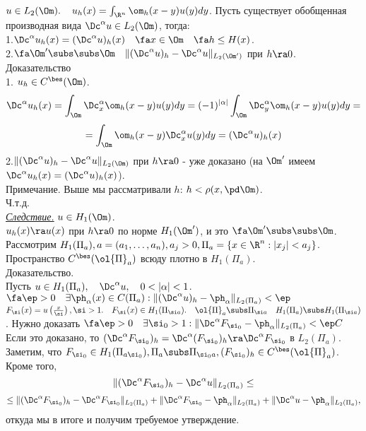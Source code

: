 \documentclass[a4paper,draft]{article}
\begin{document}
$u\in
L_2(\Om).\quad$$u_h(x)=\int_{\R^{n}}\om_h(x-y)u(y)dy$.
Пусть существует обобщенная производная вида
$\Dc^{\alpha}u\in L_2(\Om)$, тогда:\\
1.$\Dc^{\alpha}u_h(x)=(\Dc^{\alpha}u)_h(x) \quad
\fa x\in\Om \quad\fa h\le H(x)$.\\
2.$\fa \Om'\subs\subs\Om\quad
\|(\Dc^{\alpha}u)_h-\Dc^{\alpha}u\|_{L_2(\Om')}$
при $h\ra 0$.\\
Доказательство\\
1. $u_h\in C^{\bes}(\Om)$.
$$
\Dc^{\alpha}u_h(x)=\int_{\Om}\Dc_x^{\alpha}\om_h(x-y)u(y)dy=
(-1)^{|\alpha|}\int_{\Om}\Dc_y^{\alpha}\om_h(x-y)u(y)dy=
$$
$$
=\int_{\Om}\om_h(x-y)\Dc_x^{\alpha}u(y)dy=(\Dc^{\alpha}u)_h(x)
$$
2.$\|(\Dc^{\alpha}u)_h-\Dc^{\alpha}u\|_{L_2(\Om)}$
при $h\ra 0$ - уже доказано (на $\Om'$ имеем $\Dc^{\alpha}u_h(x)=(\Dc^{\alpha}u)_h(x)$).\\
Примечание. Выше мы рассматривали $h$:
$h<\rho(x,\pd\Om)$.\\
Ч.т.д.\\
\textit{\underline{Следствие.}} $u\in H_1(\Om)$.\\
$u_h(x)\ra u(x)$ при $h\ra 0$ по норме
$H_1(\Om')$, и это $\fa \Om'\subs\subs\Om$.
Рассмотрим $H_1(\Pi_a), a=(a_1,\ldots,a_n), a_j>0,
\Pi_a=\{x\in\R^n:|x_j|<a_j\}$.\\
Пространство $C^{\bes}(\ol{\Pi}_a)$ всюду плотно в
$H_1(\Pi_a)$.\\
Доказательство.\\
Пусть $u\in H_1(\Pi_a),\quad\Dc^{\alpha}u,\quad 0<|\alpha|<1$.\\
$\fa\ep>0\quad\exists\ph_{\alpha}(x)\in C(\Pi_a):
\|(\Dc^{\alpha}u)_h-\ph_{\alpha}\|_{L_2(\Pi_a)}<\ep$\\
$F_{\si}(x)=u\left(\frac{x}{\si}\right), \si>1.\quad
F_{\si}(x)\in H_1(\Pi_{\si a}).\quad
\ol{\Pi}_a\subs\Pi_{\si a} \quad H_1(\Pi_a)\subs
H_1(\Pi_{\si a})$. Нужно доказать
$\fa\ep>0\quad\exists\si_0>1:
\|\Dc^{\alpha}F_{\si_0}-\ph_{\alpha}\|_{L_2(\Pi_a)}<\ep
C$\\
Если это доказано, то
$(\Dc^{\alpha}F_{\si_0})_h=\Dc^{\alpha}(F_{\si_0})_h\ra\Dc^{\alpha}F_{\si_0}$
в $L_2(\Pi_a)$.\\
Заметим, что $F_{\si_0}\in
H_1(\Pi_{a\si_0}),\Pi_a\subs\Pi_{\si_0
a},(F_{\si_0})_h\in C^{\bes}(\ol{\Pi}_a)$.\\
Кроме того,
$$
\|(\Dc^{\alpha}F_{\si_0})_h-\Dc^{\alpha}u\|_{L_2(\Pi_a)}\le
$$
$$
\le\|(\Dc^{\alpha}F_{\si_0})_h-\Dc^{\alpha}F_{\si_0}\|_{L_2(\Pi_a)}+
\|\Dc^{\alpha}F_{\si_0}-\ph_{\alpha}\|_{L_2(\Pi_a)}+
\|\Dc^{\alpha}u-\ph_{\alpha}\|_{L_2(\Pi_a)},
$$
откуда мы в итоге и получим требуемое утверждение.
\end{document}
